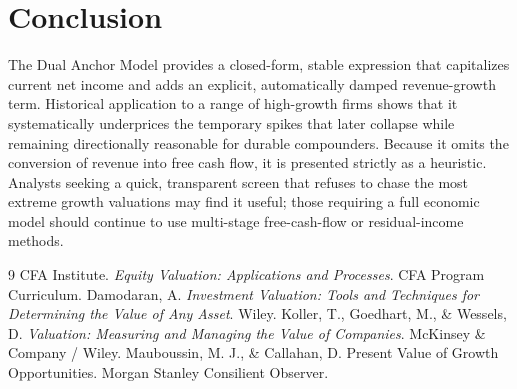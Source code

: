 \documentclass[11pt]{article}
\begin{document}
\section{Conclusion}
The Dual Anchor Model provides a closed-form, stable expression that capitalizes current net income and adds an explicit, automatically damped revenue-growth term. Historical application to a range of high-growth firms shows that it systematically underprices the temporary spikes that later collapse while remaining directionally reasonable for durable compounders. Because it omits the conversion of revenue into free cash flow, it is presented strictly as a heuristic. Analysts seeking a quick, transparent screen that refuses to chase the most extreme growth valuations may find it useful; those requiring a full economic model should continue to use multi-stage free-cash-flow or residual-income methods.

\begin{thebibliography}{9}
 CFA Institute. \textit{Equity Valuation: Applications and Processes}. CFA Program Curriculum.
 Damodaran, A. \textit{Investment Valuation: Tools and Techniques for Determining the Value of Any Asset}. Wiley.
 Koller, T., Goedhart, M., \& Wessels, D. \textit{Valuation: Measuring and Managing the Value of Companies}. McKinsey \& Company / Wiley.
 Mauboussin, M. J., \& Callahan, D. Present Value of Growth Opportunities. Morgan Stanley Consilient Observer.
\end{thebibliography}
\end{document}
